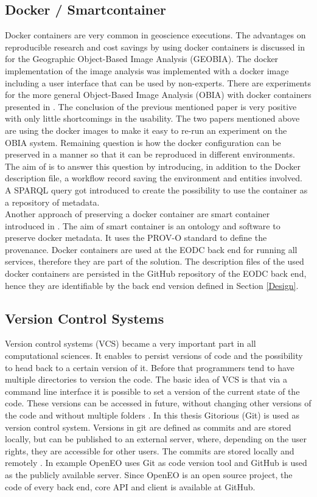 \documentclass[draft,final]{vutinfth} %
\begin{document}
\subsection{Docker / Smartcontainer}\label{Smartcontainer}
Docker containers are very common in geoscience executions. The advantages on reproducible research and cost savings by using docker containers is discussed in \cite{rs9030290} for the Geographic Object-Based Image Analysis (GEOBIA). The docker implementation of the image analysis was implemented with a docker image including a user interface that can be used by non-experts. There are experiments for the more general Object-Based Image Analysis (OBIA) with docker containers presented in \cite{proceedings456}. The conclusion of the previous mentioned paper is very positive with only little shortcomings in the usability. The two papers mentioned above are using the docker images to make it easy to re-run an experiment on the OBIA system. Remaining question is how the docker configuration can be preserved in a manner so that it can be reproduced in different environments. The aim of \cite{emsley2017a} is to answer this question by introducing, in addition to the Docker description file, a workflow record saving the environment and entities involved. A SPARQL query got introduced to create the possibility to use the container as a repository of metadata.\\ 
Another approach of preserving a docker container are smart container introduced in \cite{Huo2015SmartCA}. The aim of smart container is an ontology and software to preserve docker metadata. It uses the PROV-O standard to define the provenance. 
Docker containers are used at the EODC back end for running all services, therefore they are part of the solution. The description files of the used docker containers are persisted in the GitHub repository of the EODC back end, hence they are identifiable by the back end version defined in Section \ref{Design}.   


\subsection{Version Control Systems}\label{Version Control Systems}
Version control systems (VCS) became a very important part in all computational sciences. It enables to persist versions of code and the possibility to head back to a certain version of it. Before that programmers tend to have multiple directories to version the code. The basic idea of VCS is that via a command line interface it is possible to set a version of the current state of the code. These versions can be accessed in future, without changing other versions of the code and without multiple folders \cite{10.1109/MCSE.2009.194}. 
In this thesis Gitorious (Git) is used as version control system. Versions in git are defined as commits and are stored locally, but can be published to an external server, where, depending on the user rights, they are accessible for other users. The commits are stored locally and remotely \cite{QuickGit}. In example OpenEO uses Git as code version tool and GitHub is used as the publicly available server. Since OpenEO is an open source project, the code of every back end, core API and client is available at GitHub.  
\end{document}
